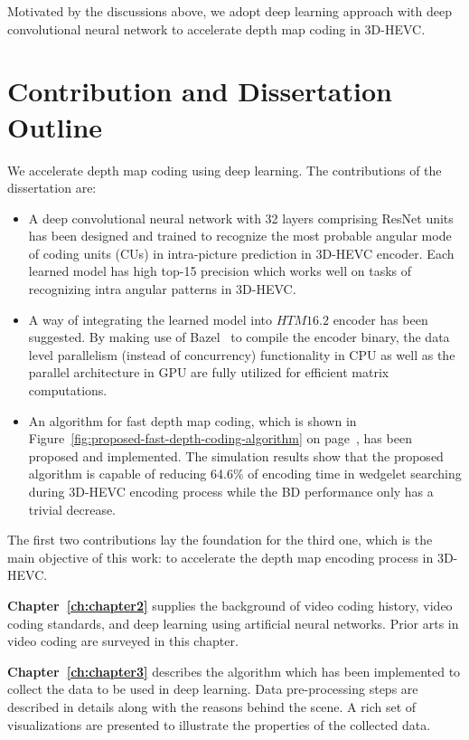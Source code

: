 Motivated by the discussions above, we adopt deep learning approach with
deep convolutional neural network to accelerate depth map coding in
3D-HEVC\@.

\section{Contribution and Dissertation Outline}\label{sec:outline}
We accelerate depth map coding using deep learning.
The contributions of the dissertation are:
\begin{itemize}
  \item A deep convolutional neural network with 32 layers 
  comprising ResNet units~\parencite{RN67}
  has been designed and trained to recognize the
  most probable angular mode of coding units (CUs) 
  in intra-picture prediction in 3D-HEVC
  encoder.
  Each learned model has high top-15 precision which works 
  well on tasks of recognizing intra angular patterns in 3D-HEVC\@.
  \item A way of integrating the learned model into \(HTM16.2\) encoder has
  been suggested.
  By making use of Bazel~\parencite{RN200} to compile the encoder binary, the
  data level parallelism (instead of concurrency) functionality in CPU
  as well as the parallel architecture in GPU are fully utilized for
  efficient matrix computations.
  \item An algorithm for fast
  depth map coding, which is shown
  in Figure~\ref{fig:proposed-fast-depth-coding-algorithm}
  on page~\pageref{fig:proposed-fast-depth-coding-algorithm},
  has been proposed and implemented.
  The simulation results show that the proposed algorithm is capable of
  reducing 64.6\% of encoding time in wedgelet searching during 3D-HEVC encoding process
  while the BD performance only has a trivial decrease.
\end{itemize}
The first two contributions lay the foundation for the third one, which is the
main objective of this work: to accelerate the depth map encoding process in
3D-HEVC\@.

\textbf{Chapter~\ref{ch:chapter2}} supplies the background of video
coding history, video coding standards, and deep learning using artificial
neural networks.
Prior arts in video coding are surveyed in this chapter.

\textbf{Chapter~\ref{ch:chapter3}} describes the algorithm which has been
implemented to collect the data to be used in deep learning.
Data pre-processing steps are described in details along with
the reasons behind the scene. 
A rich set of visualizations are presented to illustrate 
the properties of the collected data.

